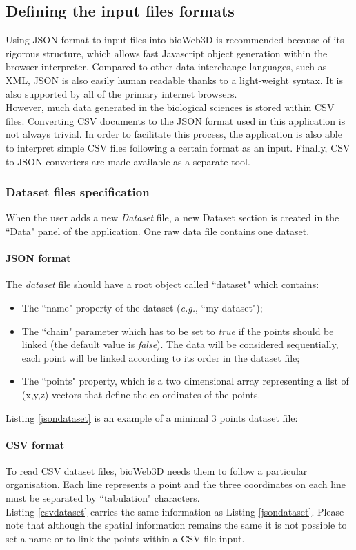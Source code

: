 \documentclass[10pt]{bmc_article}
\newenvironment{bmcformat}{\baselineskip20pt\sloppy\setboolean{publ}{false}}{\baselineskip20pt\sloppy}
\begin{document}
\begin{bmcformat}
\subsection{Defining the input files formats}
Using JSON format to input files into bioWeb3D is recommended because of its rigorous structure, which allows fast Javascript object generation within the browser interpreter. Compared to other data-interchange languages, such as XML, JSON is also easily human readable thanks to a light-weight syntax. It is also supported by all of the primary internet browsers.\\
However, much data generated in the biological sciences is stored within CSV files. Converting CSV documents to the JSON format used in this application is not always trivial. In order to facilitate this process, the application is also able to interpret simple CSV files following a certain format as an input. Finally, CSV to JSON converters are made available as a separate tool.


\subsubsection{Dataset files specification}
When the user adds a new {\it{Dataset}} file, a new Dataset section is created in the ``Data" panel of the application. One raw data file contains one dataset.\\
\paragraph{JSON format}
The {\it{dataset}} file should have a root object called ``dataset" which contains: \begin{itemize}
\item{The ``name" property of the dataset (\textit{e.g.}, ``my dataset");}
\item{The ``chain" parameter which has to be set to \textit{true} if the points should be linked (the default value is \textit{false}). The data will be considered sequentially, each point will be linked according to its order in the dataset file;}
\item{The ``points" property, which is a two dimensional array representing a list of (x,y,z) vectors that define the co-ordinates of the points.}
\end{itemize}

Listing \ref{jsondataset} is an example of a minimal 3 points dataset file:

\paragraph{CSV format}
To read CSV dataset files, bioWeb3D needs them to follow a particular organisation. Each line represents a point and the three coordinates on each line must be separated by ``tabulation" characters.\\Listing \ref{csvdataset} carries the same information as Listing \ref{jsondataset}. Please note that although the spatial information remains the same it is not possible to set a name or to link the points within a CSV file input.




\end{bmcformat}
\end{document}
